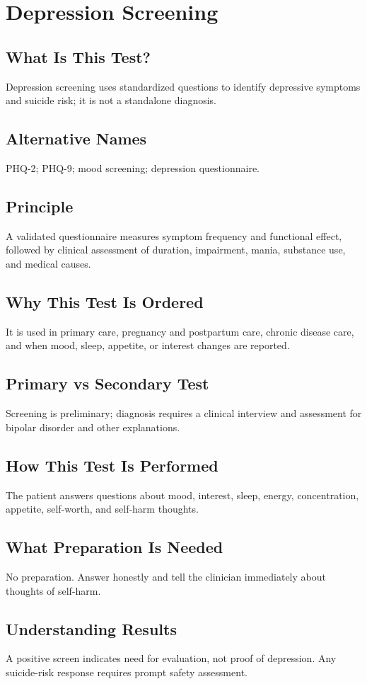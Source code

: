 \chapter{Depression Screening}
\section*{What Is This Test?} Depression screening uses standardized questions to identify depressive symptoms and suicide risk; it is not a standalone diagnosis.
\section*{Alternative Names} PHQ-2; PHQ-9; mood screening; depression questionnaire.
\section*{Principle} A validated questionnaire measures symptom frequency and functional effect, followed by clinical assessment of duration, impairment, mania, substance use, and medical causes.
\section*{Why This Test Is Ordered} It is used in primary care, pregnancy and postpartum care, chronic disease care, and when mood, sleep, appetite, or interest changes are reported.
\section*{Primary vs Secondary Test} Screening is preliminary; diagnosis requires a clinical interview and assessment for bipolar disorder and other explanations.
\section*{How This Test Is Performed} The patient answers questions about mood, interest, sleep, energy, concentration, appetite, self-worth, and self-harm thoughts.
\section*{What Preparation Is Needed} No preparation. Answer honestly and tell the clinician immediately about thoughts of self-harm.
\section*{Understanding Results} A positive screen indicates need for evaluation, not proof of depression. Any suicide-risk response requires prompt safety assessment.
